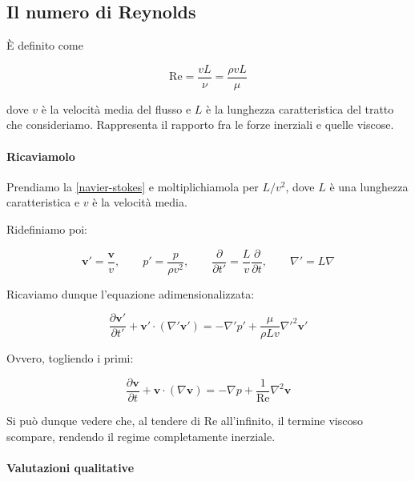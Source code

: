 \documentclass[12pt,a4paper]{article}
\numberwithin{equation}{section}
\begin{document}
\subsection{Il numero di Reynolds}

È definito come

\begin{equation}
\text{Re} = \frac{v L}{\nu} = \frac{\rho v L}{\mu}
\end{equation}

dove $v$ è la velocità media del flusso e $L$ è la lunghezza caratteristica del tratto che consideriamo.
Rappresenta il rapporto fra le forze inerziali e quelle viscose.

\paragraph{Ricaviamolo}

Prendiamo la \eqref{navier-stokes} e moltiplichiamola per $L/v^2$, dove $L$ è una lunghezza caratteristica e $v$ è la velocità media.

Ridefiniamo poi: 

\begin{equation}
\mathbf{v'} = \frac{\mathbf{v}}{v},\qquad p' = \frac{p}{\rho v^2},\qquad \frac{\partial}{\partial t'} = \frac{L}{v} \frac{\partial}{\partial t},\qquad \nabla' = L \nabla
\end{equation}

Ricaviamo dunque l'equazione adimensionalizzata: 

\begin{equation}
\frac{\partial \mathbf{v'}}{\partial t'} +\mathbf{v'} \cdot (\nabla' \mathbf{v'})  = -\nabla' p' + \frac{\mu}{\rho L v} \nabla'^2 \mathbf{v'}
\end{equation}

Ovvero, togliendo i primi:

\begin{equation}
\frac{\partial \mathbf{v}}{\partial t} +\mathbf{v} \cdot (\nabla \mathbf{v}) = -\nabla p + \frac{1}{\text{Re}} \nabla^2 \mathbf{v}
\end{equation}

Si può dunque vedere che, al tendere di Re all'infinito, il termine viscoso scompare, rendendo il regime completamente inerziale.

\paragraph{Valutazioni qualitative}
\end{document}
